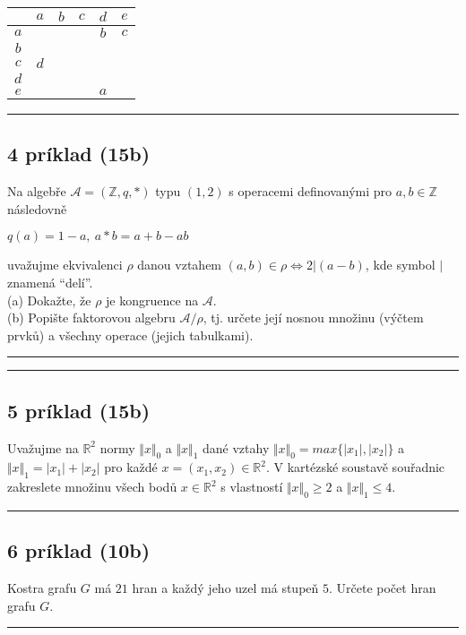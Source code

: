 \documentclass[11pt,a4paper]{article}
\begin{document}
  \begin{center}
    \begin{tabular}{c||c|c|c|c|c|}
          & $a$ & $b$ & $c$ & $d$ & $e$ \\
      \hline
      \hline
      $a$ &     &     &     & $b$ & $c$ \\
      \hline
      $b$ &     &     &     &     &     \\
      \hline
      $c$ & $d$ &     &     &     &     \\
      \hline
      $d$ &     &     &     &     &     \\
      \hline
      $e$ &     &     &     & $a$ &     \\
      \hline
    \end{tabular}
  \end{center}

  \hrule

\subsection*{4 príklad (15b)}

  Na algebře $\mathcal{A} = (\mathbb{Z},q,\ast)$ typu $(1,2)$ s operacemi definovanými pro $a,b \in \mathbb{Z}$ následovně

  \begin{center}
    $q(a) = 1 - a, \ a \ast b = a + b - ab$
  \end{center}

  uvažujme ekvivalenci $\rho$ danou vztahem $(a,b) \in \rho \Leftrightarrow 2 | (a - b)$, kde symbol $|$ znamená \enquote{delí}.\\[2mm]
  (a) Dokažte, že $\rho$ je kongruence na $\mathcal{A}$.\\
  (b) Popište faktorovou algebru $\mathcal{A} / \rho$, tj. určete její nosnou množinu (výčtem prvků) a všechny operace (jejich tabulkami).\\

  \hrule

  \newpage

  \hrule

\subsection*{5 príklad (15b)}

  Uvažujme na $\mathbb{R}^2$ normy $\Vert x \Vert_0$ a $\Vert x \Vert_1$ dané vztahy $\Vert x \Vert_0 = max \{|x_1|, |x_2|\}$ a $\Vert x \Vert_1 = |x_1| + |x_2|$ pro každé $x = (x_1, x_2) \in \mathbb{R}^2$. V kartézské soustavě souřadnic zakreslete množinu všech bodů $x \in \mathbb{R}^2$ s vlastností $\Vert x \Vert_0 \geq 2$ a $\Vert x \Vert_1 \leq 4$.\\

  \hrule

\subsection*{6 príklad (10b)}

  Kostra grafu $G$ má $21$ hran a každý jeho uzel má stupeň $5$. Určete počet hran grafu $G$.\\

  \hrule
\end{document}
